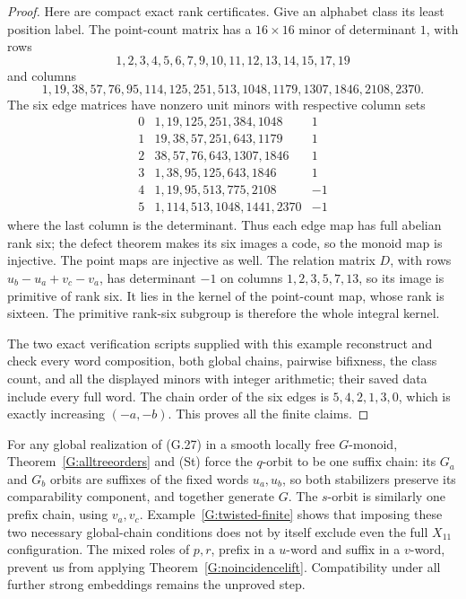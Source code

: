 \begin{proof}
Here are compact exact rank certificates. Give an alphabet
class its least position label. The point-count matrix has a
$16\times16$ minor of determinant $1$, with rows
\[
 1,2,3,4,5,6,7,9,10,11,12,13,14,15,17,19
\]
and columns
\[
 1,19,38,57,76,95,114,125,251,513,1048,1179,1307,1846,2108,2370.
\]
The six edge matrices have nonzero unit minors with respective
column sets
\[
\begin{array}{c|l|r}
0&1,19,125,251,384,1048&1\\
1&19,38,57,251,643,1179&1\\
2&38,57,76,643,1307,1846&1\\
3&1,38,95,125,643,1846&1\\
4&1,19,95,513,775,2108&-1\\
5&1,114,513,1048,1441,2370&-1
\end{array}
\]
where the last column is the determinant. Thus each edge
map has full abelian rank six; the defect theorem makes its
six images a code, so the monoid map is injective. The point
maps are injective as well. The relation matrix $D$, with
rows $u_b-u_a+v_c-v_a$, has determinant $-1$ on columns
$1,2,3,5,7,13$, so its image is primitive of rank six.
It lies in the kernel of the point-count map, whose rank is
sixteen. The primitive rank-six subgroup is therefore the
whole integral kernel.

The two exact verification scripts supplied with this example
reconstruct and check every word composition, both global chains,
pairwise bifixness, the class count, and all the displayed minors
with integer arithmetic; their saved data include every full word.
The chain order of the six edges is $5,4,2,1,3,0$, which is
exactly increasing $(-a,-b)$. This proves all the finite claims.
\end{proof}

For any global realization of (G.27) in a smooth locally free
$G$-monoid, Theorem~\ref{G:alltreeorders} and (St) force the
$q$-orbit to be one suffix chain: its $G_a$ and $G_b$ orbits
are suffixes of the fixed words $u_a,u_b$, so both stabilizers
preserve its comparability component, and together generate
$G$. The $s$-orbit is similarly one prefix chain, using
$v_a,v_c$. Example~\ref{G:twisted-finite} shows that imposing
these two necessary global-chain conditions does not by itself
exclude even the full $X_{11}$ configuration. The mixed roles
of $p,r$, prefix in a $u$-word and suffix in a $v$-word, prevent
us from applying Theorem~\ref{G:noincidencelift}. Compatibility
under all further strong embeddings remains the unproved step.


